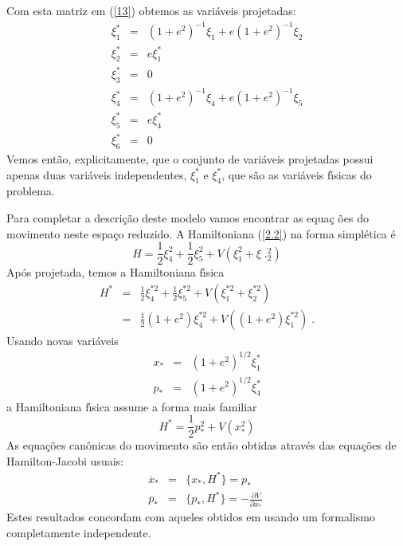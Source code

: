 \documentclass[a4paper,thmsa,12pt]{report}
\begin{document}
Com esta matriz em (\ref{13}) obtemos as vari\'{a}veis projetadas: 
\begin{eqnarray}
\xi _{1}^{\ast } &=&\left( 1+e^{2}\right) ^{-1}\xi _{1}+e\left(
1+e^{2}\right) ^{-1}\xi _{2}  \label{2.7a} \\
\xi _{2}^{\ast } &=&e\xi _{1}^{\ast }  \label{2.7b} \\
\xi _{3}^{\ast } &=&0  \label{2.7c} \\
\xi _{4}^{\ast } &=&\left( 1+e^{2}\right) ^{-1}\xi _{4}+e\left(
1+e^{2}\right) ^{-1}\xi _{5}  \label{2.7d} \\
\xi _{5}^{\ast } &=&e\xi _{4}^{\ast }  \label{2.7e} \\
\xi _{6}^{\ast } &=&0  \label{2.7f}
\end{eqnarray}
Vemos ent\~{a}o, explicitamente, que o conjunto de vari\'{a}veis projetadas
possui apenas duas vari\'{a}veis independentes, $\xi _{1}^{*}$ e $\xi
_{4}^{*} $, que s\~{a}o as vari\'{a}veis f\'{\i}sicas do problema.

Para completar a descri\c{c}\~{a}o deste modelo vamos encontrar as equa\c{c}%
\~{o}es do movimento neste espa\c{c}o reduzido. A Hamiltoniana (\ref{2.2})
na forma simpl\'{e}tica \'{e} 
\begin{equation}
H=\frac{1}{2}\xi _{4}^{2}+\frac{1}{2}\xi _{5}^{2}+V(\xi _{1}^{2}+\xi\;.
_{2}^{2})  \label{2.8}
\end{equation}
Ap\'{o}s projetada, temos a Hamiltoniana f\'{\i}sica 
\begin{eqnarray}
H^{*} &=&\frac{1}{2}\xi _{4}^{*2}+\frac{1}{2}\xi _{5}^{*2}+V(\xi
_{1}^{*2}+\xi _{2}^{*2}) \\
&=&\frac{1}{2}\left( 1+e^{2}\right) \xi _{4}^{*2}+V(\left( 1+e^{2}\right)
\xi _{1}^{*2}) \;. \label{2.9}
\end{eqnarray}
Usando novas vari\'{a}veis 
\begin{eqnarray}
x_{*} &=&\left( 1+e^{2}\right) ^{1/2}\xi _{1}^{*}  \label{2.10a} \\
p_{*} &=&\left( 1+e^{2}\right) ^{1/2}\xi _{4}^{*}  \label{2.10b}
\end{eqnarray}
a Hamiltoniana f\'{\i}sica assume a forma mais familiar 
\begin{equation}
H^{*}=\frac{1}{2}p_{*}^{2}+V(x_{*}^{2})  \label{2.11}
\end{equation}
As equa\c{c}\~{o}es can\^{o}nicas do movimento s\~{a}o ent\~{a}o obtidas
atrav\'{e}s das equa\c{c}\~{o}es de Hamilton-Jacobi usuais: 
\begin{eqnarray}
\stackrel{.}{x}_{*} &=&\{x_{*},H^{*}\}=p_{*}  \label{2.12a} \\
\stackrel{.}{p}_{*} &=&\{p_{*},H^{*}\}=-\frac{\partial V}{\partial x_{*}}\;
\label{2.12b}
\end{eqnarray}
Estes resultados concordam com aqueles obtidos em \cite{costa-girotti}
usando um formalismo completamente independente.
\end{document}
